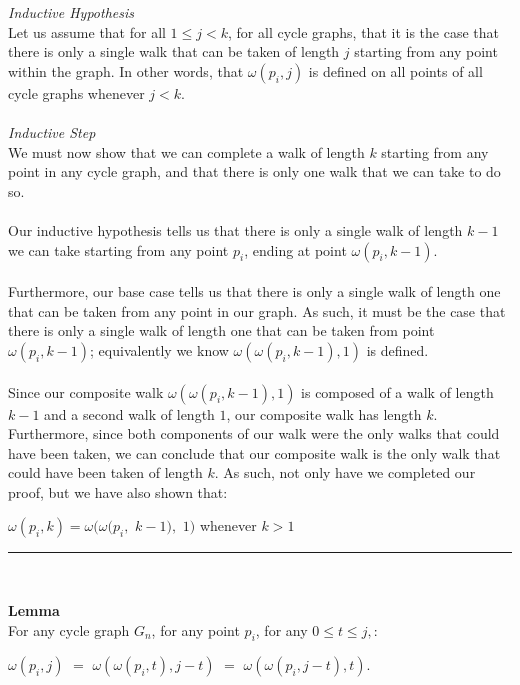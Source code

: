 \documentclass[a4paper,12pt]{article}
\begin{document}
\textit{Inductive Hypothesis}\\
Let us assume that for all $1 \leq j < k$, for all cycle graphs, that it is the case that there is only a single walk that can be taken of length $j$ starting from any point within the graph. In other words, that $\omega(p_i, j)$ is defined on all points of all cycle graphs whenever $j < k$.\\
\\
\textit{Inductive Step}\\
We must now show that we can complete a walk of length $k$ starting from any point in any cycle graph, and that there is only one walk that we can take to do so.\\
\\
Our inductive hypothesis tells us that there is only a single walk of length $k - 1$ we can take starting from any point $p_i$, ending at point $\omega(p_i, k - 1)$.\\
\\
Furthermore, our base case tells us that there is only a single walk of length one that can be taken from any point in our graph. As such, it must be the case that there is only a single walk of length one that can be taken from point $\omega(p_i, k - 1)$; equivalently we know $\omega(\omega(p_i, k - 1), 1)$ is defined.\\
\\
Since our composite walk $\omega(\omega(p_i, k - 1), 1)$ is composed of a walk of length $k - 1$ and a second walk of length $1$, our composite walk has length $k$. Furthermore, since both components of our walk were the only walks that could have been taken, we can conclude that our composite walk is the only walk that could have been taken of length $k$. As such, not only have we completed our proof, but we have also shown that: 
\begin{center}
$\omega(p_i, k) = \omega(\omega(p_i,$ $k - 1),$ $1)$ whenever $k > 1$
\end{center}
\begin{center}
\noindent\rule{8cm}{0.4pt}
\end{center} 
\noindent
\\
\begin{tcolorbox}
\textbf{Lemma}\\
For any cycle graph $G_n$, for any point $p_i$, for any $0 \leq t \leq j,$:
\begin{center}
$\omega(p_i, j)$ $=$ $\omega(\omega(p_i, t), j - t)$ $=$ $\omega(\omega(p_i, j - t), t)$. 
\end{center}
\end{tcolorbox}
\end{document}
